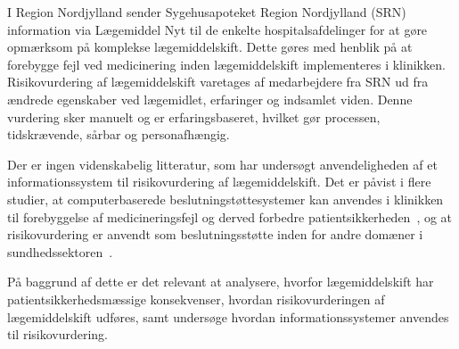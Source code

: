 I Region Nordjylland sender Sygehusapoteket Region Nordjylland (SRN) information via Lægemiddel Nyt til de enkelte hospitalsafdelinger for at gøre opmærksom på komplekse lægemiddelskift. Dette gøres med henblik på at forebygge fejl ved medicinering inden lægemiddelskift implementeres i klinikken. Risikovurdering af lægemiddelskift varetages af medarbejdere fra SRN ud fra ændrede egenskaber ved lægemidlet, erfaringer og indsamlet viden. Denne vurdering sker manuelt og er erfaringsbaseret, hvilket gør processen, tidskrævende, sårbar og personafhængig.

Der er ingen videnskabelig litteratur, som har undersøgt anvendeligheden af et informationssystem til risikovurdering af lægemiddelskift. 
Det er påvist i flere studier, at computerbaserede beslutningstøttesystemer kan anvendes i klinikken til forebyggelse af medicineringsfejl og derved forbedre patientsikkerheden~\citep{Agrawal2009, Stenner2010, Fischer2008, Simpson2008}, og at risikovurdering er anvendt som beslutningsstøtte inden for andre domæner i sundhedssektoren~\citep{Geissert2018, Rawshani2018, Barbar2010}. 

På baggrund af dette er det relevant at analysere, hvorfor lægemiddelskift har patientsikkerhedsmæssige konsekvenser, hvordan risikovurderingen af lægemiddelskift udføres, samt undersøge hvordan informationssystemer anvendes til risikovurdering.
